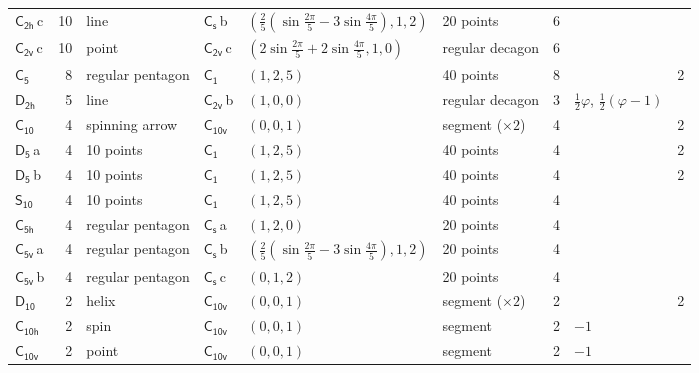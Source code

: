 \documentclass[10pt,a4paper]{article}
\numberwithin{equation}{section}
\newcommand{\grp}[1]{\mathsf{#1}}
\newcommand{\clsletter}[1]{\,{\scriptsize\color{black!55}#1}}
\newcommand{\goldenratio}{\varphi}
\newlength{\fillwidth}\newlength{\cellwidth}\newlength{\colwidth}
\begin{document}
{{\begin{longtable}{@{}lrllllr>{\RaggedRight\arraybackslash}p{\fillwidth}r@{}}
\href{C2h.pdf}{$\grp{C_{2h}}$}\clsletter{c} & 10 & line & \href{C1v.pdf}{$\grp{C_{s}}$}\clsletter{b} & $(\tfrac{2}{5}(\sin\tfrac{2\pi}{5} - 3\sin\tfrac{4\pi}{5}), 1, 2)$ & 20 points & 6 &  & \\
\href{C2v.pdf}{$\grp{C_{2v}}$}\clsletter{c} & 10 & point & \href{C2v.pdf}{$\grp{C_{2v}}$}\clsletter{c} & $(2\sin\tfrac{2\pi}{5} + 2\sin\tfrac{4\pi}{5}, 1, 0)$ & regular decagon & 6 &  & \\
\href{C5.pdf}{$\grp{C_{5}}$} & 8 & regular pentagon & \href{C1.pdf}{$\grp{C_{1}}$} & $(1, 2, 5)$ & 40 points & 8 &  & 2\\
\href{D2h.pdf}{$\grp{D_{2h}}$} & 5 & line & \href{C2v.pdf}{$\grp{C_{2v}}$}\clsletter{b} & $(1, 0, 0)$ & regular decagon & 3 & ${\tfrac{1}{2}\goldenratio{}}$, ${\tfrac{1}{2}(\goldenratio - 1)}$ & \\
\href{C10.pdf}{$\grp{C_{10}}$} & 4 & spinning arrow & \href{C10v.pdf}{$\grp{C_{10v}}$} & $(0, 0, 1)$ & segment (${\times}2$) & 4 &  & 2\\
\href{D5.pdf}{$\grp{D_{5}}$}\clsletter{a} & 4 & 10 points & \href{C1.pdf}{$\grp{C_{1}}$} & $(1, 2, 5)$ & 40 points & 4 &  & 2\\
\href{D5.pdf}{$\grp{D_{5}}$}\clsletter{b} & 4 & 10 points & \href{C1.pdf}{$\grp{C_{1}}$} & $(1, 2, 5)$ & 40 points & 4 &  & 2\\
\href{S10.pdf}{$\grp{S_{10}}$} & 4 & 10 points & \href{C1.pdf}{$\grp{C_{1}}$} & $(1, 2, 5)$ & 40 points & 4 &  & \\
\href{C5h.pdf}{$\grp{C_{5h}}$} & 4 & regular pentagon & \href{C1v.pdf}{$\grp{C_{s}}$}\clsletter{a} & $(1, 2, 0)$ & 20 points & 4 &  & \\
\href{C5v.pdf}{$\grp{C_{5v}}$}\clsletter{a} & 4 & regular pentagon & \href{C1v.pdf}{$\grp{C_{s}}$}\clsletter{b} & $(\tfrac{2}{5}(\sin\tfrac{2\pi}{5} - 3\sin\tfrac{4\pi}{5}), 1, 2)$ & 20 points & 4 &  & \\
\href{C5v.pdf}{$\grp{C_{5v}}$}\clsletter{b} & 4 & regular pentagon & \href{C1v.pdf}{$\grp{C_{s}}$}\clsletter{c} & $(0, 1, 2)$ & 20 points & 4 &  & \\
\href{D10.pdf}{$\grp{D_{10}}$} & 2 & helix & \href{C10v.pdf}{$\grp{C_{10v}}$} & $(0, 0, 1)$ & segment (${\times}2$) & 2 &  & 2\\
\href{C10h.pdf}{$\grp{C_{10h}}$} & 2 & spin & \href{C10v.pdf}{$\grp{C_{10v}}$} & $(0, 0, 1)$ & segment & 2 & ${-1}$ & \\
\href{C10v.pdf}{$\grp{C_{10v}}$} & 2 & point & \href{C10v.pdf}{$\grp{C_{10v}}$} & $(0, 0, 1)$ & segment & 2 & ${-1}$ & \\

\end{longtable}}}
\end{document}
